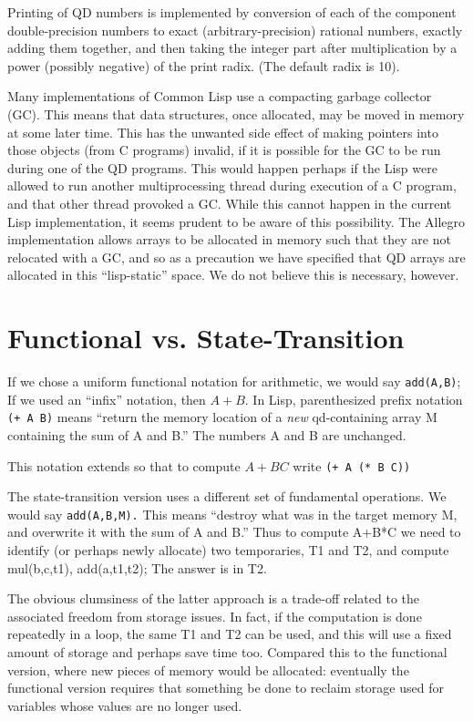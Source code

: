 \documentclass{article}
\begin{document}
Printing of QD numbers is implemented by conversion of each of the
component double-precision numbers to exact (arbitrary-precision)
rational numbers, exactly adding them together,
and then taking the integer part after
multiplication by a power (possibly negative) of the print radix. (The
default radix is 10).

Many implementations of Common Lisp use a compacting garbage collector
(GC).  This means that data structures, once allocated, may be moved
in memory at some later time. This has the unwanted side effect of
making pointers into those objects (from C programs) invalid, if it is
possible for the GC to be run during one of the QD programs.  This
would happen perhaps if the Lisp were allowed to run another
multiprocessing thread during execution of a C program, and that other
thread provoked a GC.  While this cannot happen in the current Lisp
implementation, it seems prudent to be aware of this possibility.  The
Allegro implementation allows arrays to be allocated in memory such
that they are not relocated with a GC, and so as a precaution we have
specified that QD arrays are allocated in this ``lisp-static'' space.
We do not believe this is necessary, however.

\section{Functional vs. State-Transition}

If we chose a uniform functional notation for arithmetic, we
would say {\tt add(A,B)}; If we used an ``infix'' notation, then $A+B$. In Lisp,
parenthesized prefix notation {\tt (+ A B)} means ``return
the memory location of a {\em new} qd-containing array M containing 
the sum of A and B.''  The numbers A and B are unchanged.

This notation extends so that to compute $A+BC$ write {\tt (+ A (* B C))}

The state-transition version uses a different set of fundamental
operations. We would say {\tt add(A,B,M).} This means ``destroy what
was in the target memory M, and overwrite it with the sum of A and
B.''  Thus to compute A+B*C we need to identify (or perhaps newly
allocate) two temporaries, T1 and T2, and compute mul(b,c,t1),
add(a,t1,t2); The answer is in T2.

The obvious clumsiness of the latter approach is a trade-off  related to the
associated freedom from storage issues. In fact, if the computation is
done repeatedly in a loop, the same T1 and T2 can be used, and this
will use a fixed amount of storage and perhaps save time too. Compared
this to the
functional version, where new pieces of memory would be allocated:
eventually the functional
version  requires that something be done to reclaim storage used
for variables whose values are no longer used.
\end{document}
